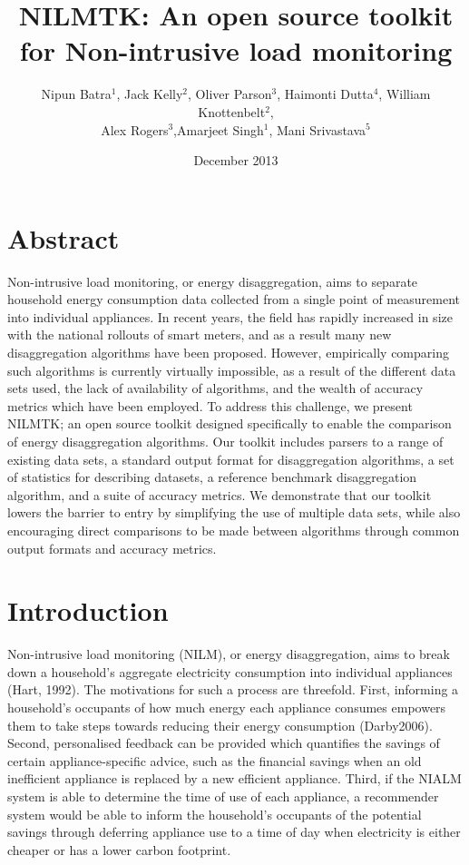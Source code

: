\documentclass{sig-alternate}
\title{NILMTK: An open source toolkit for Non-intrusive load monitoring}
\author{Nipun Batra$^1$, Jack Kelly$^2$, Oliver Parson$^3$, Haimonti Dutta$^4$, William Knottenbelt$^2$,\\ Alex Rogers$^3$,Amarjeet Singh$^1$, Mani Srivastava$^5$}
\date{December 2013}
\begin{document}
\maketitle

\section{Abstract}
Non-intrusive load monitoring, or energy disaggregation, aims to separate household energy consumption data collected from a single point of measurement into individual appliances. In recent years, the field has rapidly increased in size with the national rollouts of smart meters, and as a result many new disaggregation algorithms have been proposed. However, empirically comparing such algorithms is currently virtually impossible, as a result of the different data sets used, the lack of availability of algorithms, and the wealth of accuracy metrics which have been employed. To address this challenge, we present NILMTK; an open source toolkit designed specifically to enable the comparison of energy disaggregation algorithms. Our toolkit includes parsers to a range of existing data sets, a standard output format for disaggregation algorithms, a set of statistics for describing datasets, a reference benchmark disaggregation algorithm, and a suite of accuracy metrics. We demonstrate that our toolkit lowers the barrier to entry by simplifying the use of multiple data sets, while also encouraging direct comparisons to be made between algorithms through common output formats and accuracy metrics.

\section{Introduction}
Non-intrusive load monitoring (NILM), or energy disaggregation, aims to break down a household's aggregate electricity consumption into individual appliances (Hart, 1992). The motivations for such a process are threefold. First, informing a household's occupants of how much energy each appliance consumes empowers them to take steps towards reducing their energy consumption (Darby2006). Second, personalised feedback can be provided which quantifies the savings of certain appliance-specific advice, such as the financial savings when an old inefficient appliance is replaced by a new efficient appliance. Third, if the NIALM system is able to determine the time of use of each appliance, a recommender system would be able to inform the household's occupants of the potential savings through deferring appliance use to a time of day when electricity is either cheaper or has a lower carbon footprint.
\end{document}
